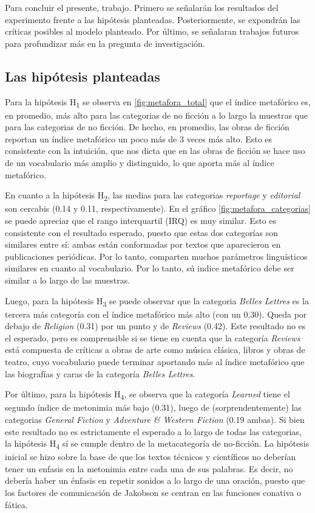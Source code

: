 \documentclass[twoside]{article}
\begin{document}
Para concluir el presente, trabajo. Primero se señalarán los
resultados del experimento frente a las hipótesis planteadas.
Posteriormente, se expondrán las críticas posibles al modelo
planteado. Por último, se señalaran trabajos futuros para profundizar
más en la pregunta de investigación.

\subsection{Las hipótesis planteadas}
\label{sec:org2b93576}

Para la hipótesis H\textsubscript{1} se observa en \ref{fig:metafora_total} que el
índice metafórico es, en promedio, más alto para las categorias de no
ficción a lo largo la muestras que para las categorias de no
ficción. De hecho, en promedio, las obras de ficción reportan un
índice metafórico un poco más de 3 veces más alto. Esto es consistente
con la intuición, que nos dicta que en las obras de ficción se hace
uso de un vocabulario más amplio y distinguido, lo que aporta más al
índice metafórico.

En cuanto a la hipótesis H\textsubscript{2}, las medias para las categorias
\emph{reportage} y \emph{editorial} son cercabis (0.14 y 0.11,
respectivamente). En el gráfico \ref{fig:metafora_categorias} se puede
apreciar que el rango interquartil (IRQ) es muy similar. Esto es
consistente con el resultado esperado, puesto que estas dos categorías
son similares entre sí: ambas están conformadas por textos que
aparecieron en publicaciones periódicas. Por lo tanto, comparten
muchos parámetros linguísticos similares en cuanto al vocabulario. Por
lo tanto, sú indice metafórico debe ser similar a lo largo de las
muestras.

Luego, para la hipótesis H\textsubscript{3} se puede observar que la categoria
\emph{Belles Lettres} es la tercera más categoría con el índice metafórico
más alto (con un 0.30). Queda por debajo de \emph{Religion} (0.31) por un
punto y de \emph{Reviews} (0.42). Este resultado no es el esperado, pero es
comprensible si se tiene en cuenta que la categoría \emph{Reviews} está
compuesta de críticas a obras de arte como música clásica, libros y
obras de teatro, cuyo vocabulario puede terminar aportando más al
índice metafórico que las biografías y caras de la categoría \emph{Belles
Lettres}.

Por último, para la hipótesis H\textsubscript{4}, se observa que la categoría
\emph{Learned} tiene el segundo índice de metonimia más bajo (0.31), luego
de (sorprendentemente) las categorias \emph{General Fiction} y \emph{Adventure \&
Western Fiction} (0.19 ambas). Si bien este resultado no es
estrictamente el esperado a lo largo de todas las categorias, la
hipótesis H\textsubscript{4} sí se cumple dentro de la metacategoría de
no-ficción. La hipótesis inicial se hizo sobre la base de que los
textos técnicos y científicos no deberían tener un enfasis en la
metonimia entre cada una de sus palabras.  Es decir, no debería haber
un énfasis en repetir sonidos a lo largo de una oración, puesto que
los factores de comunicación de Jakobson se centran en las funciones
conativa o fática.
\end{document}
